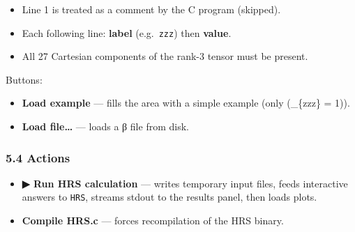 \begin{Shaded}
\begin{Highlighting}[]
\end{Highlighting}
\end{Shaded}

\begin{itemize}
\tightlist
\item
  Line 1 is treated as a comment by the C program (skipped).\\
\item
  Each following line: \textbf{label} (e.g.~\texttt{zzz}) then
  \textbf{value}.\\
\item
  All 27 Cartesian components of the rank-3 tensor must be present.
\end{itemize}

Buttons:

\begin{itemize}
\tightlist
\item
  \textbf{Load example} --- fills the area with a simple example (only
  (\beta\_\{zzz\} = 1)).\\
\item
  \textbf{Load file\ldots{}} --- loads a β file from disk.
\end{itemize}

\hypertarget{actions}{%
\subsubsection{5.4 Actions}\label{actions}}

\begin{itemize}
\tightlist
\item
  \textbf{▶ Run HRS calculation} --- writes temporary input files, feeds
  interactive answers to \texttt{HRS}, streams stdout to the results
  panel, then loads plots.\\
\item
  \textbf{Compile HRS.c} --- forces recompilation of the HRS binary.
\end{itemize}

